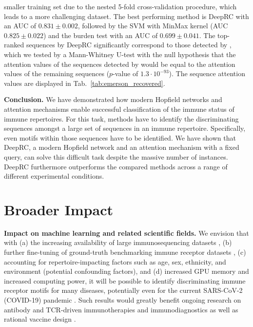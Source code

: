 \documentclass[oneside]{book}
\begin{document}
smaller training set due to the nested 5-fold cross-validation procedure,
which leads to a more challenging dataset. 
%
The best performing 
method is DeepRC with an AUC of $0.831\pm0.002$, followed by
the SVM with MinMax kernel (AUC $0.825\pm0.022$) and the burden
test with an AUC of $0.699\pm0.041$. The top-ranked sequences 
by DeepRC significantly correspond to those detected by 
\citet{emerson2017immunosequencing}, which we tested 
by a Mann-Whitney U-test with the null hypothesis that the
attention values of the sequences detected by \citet{emerson2017immunosequencing} would be equal to the attention 
values of the remaining sequences ($p$-value of $1.3\cdot10^{-93}$). 
The sequence attention values are displayed in Tab.~\ref{tab:emerson_recovered}.

%


%
\textbf{Conclusion.}
%
We have demonstrated how modern Hopfield networks and attention mechanisms
enable successful classification of the immune status of
immune repertoires.
For this task, 
methods have to identify the discriminating
sequences amongst a large set of sequences in an immune repertoire.
Specifically, 
even motifs within those sequences have to be identified.
We have shown that DeepRC, 
a modern Hopfield network and 
an attention mechanism with a fixed query, 
can solve this difficult task
despite the massive number of instances.
DeepRC furthermore outperforms the compared methods
across a range of different experimental conditions.  
%

%



\vspace{\cheatspace}
\section*{Broader Impact}
\vspace{\cheatspace}
%
\textbf{Impact on machine learning and related scientific fields.}
We envision that with (a) the increasing availability of large immunosequencing 
datasets \citep{kovaltsuk2018observed,corrie2018ireceptor, christley2018vdjserver, zhang2020pird, rosenfeld2018immunedb, shugay2018vdjdb}, 
(b) further fine-tuning of ground-truth benchmarking immune receptor 
datasets \citep{weber2019immunesim, olson2019sumrep, marcou2018high},
(c) accounting for 
repertoire-impacting factors such as age, sex, ethnicity, and environment (potential confounding factors), and
(d) increased GPU memory and increased computing power, it 
will be possible to identify discriminating immune receptor motifs for many 
diseases, potentially even for the current SARS-CoV-2 (COVID-19) 
pandemic \citep{Raybould_cov-abdb_2020,Minervina_tcr_2020, Galson_bcr_2020}. 
Such results would greatly benefit ongoing research on antibody and 
TCR-driven immunotherapies and immunodiagnostics as well as rational 
vaccine design \citep{brown2019augmenting}.
\end{document}
